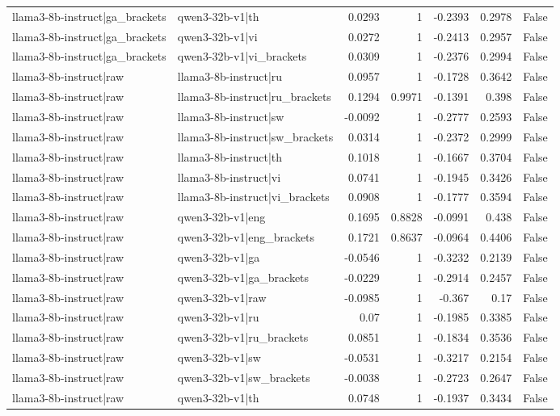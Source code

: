 \begin{table}
\begin{tabular}{l l r r r r l}
llama3-8b-instruct|ga_brackets & qwen3-32b-v1|th & 0.0293 & 1 & -0.2393 & 0.2978 & False \\
llama3-8b-instruct|ga_brackets & qwen3-32b-v1|vi & 0.0272 & 1 & -0.2413 & 0.2957 & False \\
llama3-8b-instruct|ga_brackets & qwen3-32b-v1|vi_brackets & 0.0309 & 1 & -0.2376 & 0.2994 & False \\
llama3-8b-instruct|raw & llama3-8b-instruct|ru & 0.0957 & 1 & -0.1728 & 0.3642 & False \\
llama3-8b-instruct|raw & llama3-8b-instruct|ru_brackets & 0.1294 & 0.9971 & -0.1391 & 0.398 & False \\
llama3-8b-instruct|raw & llama3-8b-instruct|sw & -0.0092 & 1 & -0.2777 & 0.2593 & False \\
llama3-8b-instruct|raw & llama3-8b-instruct|sw_brackets & 0.0314 & 1 & -0.2372 & 0.2999 & False \\
llama3-8b-instruct|raw & llama3-8b-instruct|th & 0.1018 & 1 & -0.1667 & 0.3704 & False \\
llama3-8b-instruct|raw & llama3-8b-instruct|vi & 0.0741 & 1 & -0.1945 & 0.3426 & False \\
llama3-8b-instruct|raw & llama3-8b-instruct|vi_brackets & 0.0908 & 1 & -0.1777 & 0.3594 & False \\
llama3-8b-instruct|raw & qwen3-32b-v1|eng & 0.1695 & 0.8828 & -0.0991 & 0.438 & False \\
llama3-8b-instruct|raw & qwen3-32b-v1|eng_brackets & 0.1721 & 0.8637 & -0.0964 & 0.4406 & False \\
llama3-8b-instruct|raw & qwen3-32b-v1|ga & -0.0546 & 1 & -0.3232 & 0.2139 & False \\
llama3-8b-instruct|raw & qwen3-32b-v1|ga_brackets & -0.0229 & 1 & -0.2914 & 0.2457 & False \\
llama3-8b-instruct|raw & qwen3-32b-v1|raw & -0.0985 & 1 & -0.367 & 0.17 & False \\
llama3-8b-instruct|raw & qwen3-32b-v1|ru & 0.07 & 1 & -0.1985 & 0.3385 & False \\
llama3-8b-instruct|raw & qwen3-32b-v1|ru_brackets & 0.0851 & 1 & -0.1834 & 0.3536 & False \\
llama3-8b-instruct|raw & qwen3-32b-v1|sw & -0.0531 & 1 & -0.3217 & 0.2154 & False \\
llama3-8b-instruct|raw & qwen3-32b-v1|sw_brackets & -0.0038 & 1 & -0.2723 & 0.2647 & False \\
llama3-8b-instruct|raw & qwen3-32b-v1|th & 0.0748 & 1 & -0.1937 & 0.3434 & False \\

\end{tabular}
\end{table}
